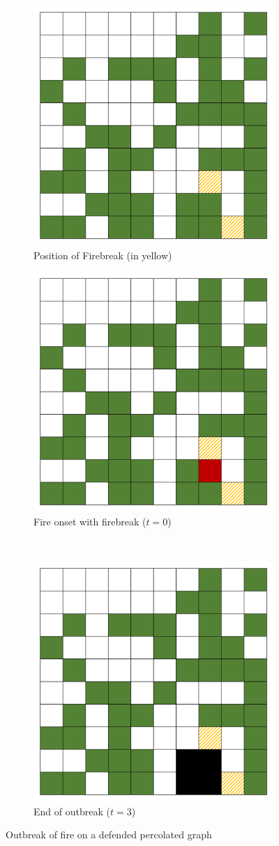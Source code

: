 \documentclass[11pt]{amsart}
\begin{document}
\begin{figure}[ht] 
  \begin{subfigure}{0.4\linewidth}
    \centering
    \includegraphics[width=0.4\linewidth]{firebreak/defended/defended} 
    \caption{Position of Firebreak (in yellow)} 
    \label{fig:defended} 
  \end{subfigure}%
  \begin{subfigure}{0.4\linewidth}
    \centering
    \includegraphics[width=0.4\linewidth]{firebreak/defended/outbreak} 
    \caption{Fire onset with firebreak ($t=0$)} 
    \label{fig:afterperc_break} 
  \end{subfigure}\\[1ex] 
  \begin{subfigure}{0.4\linewidth}
    \centering
    \includegraphics[width=0.4\linewidth]{firebreak/defended/end} 
    \caption{End of outbreak ($t=3$)} 
    \label{fig:end_defended} 
  \end{subfigure} 
  \caption{Outbreak of fire on a defended percolated graph}
  \label{fig:percolated_defended} 
\end{figure}
\end{document}
